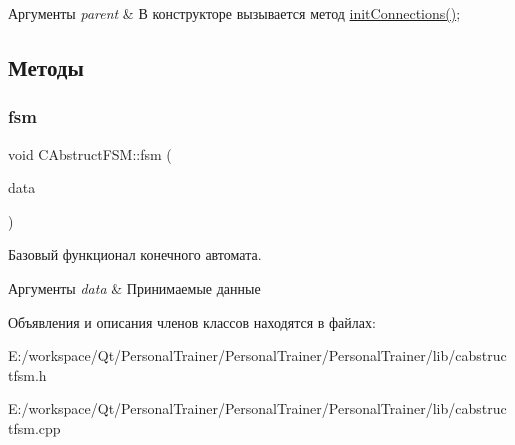 \begin{DoxyParams}{Аргументы}
{\em parent} & В конструкторе вызывается метод \hyperlink{class_c_abstruct_f_s_m_a9d6f4659a08f3028f8c047243f8dcfc3}{init\+Connections()}; \\
\hline
\end{DoxyParams}


\subsection{Методы}
\hypertarget{class_c_abstruct_f_s_m_ae06497e1f93385cd6c20eaa84fc253c1}{}\label{class_c_abstruct_f_s_m_ae06497e1f93385cd6c20eaa84fc253c1} 
\subsubsection{\texorpdfstring{fsm}{fsm}}
{\footnotesize\ttfamily void C\+Abstruct\+F\+S\+M\+::fsm (\begin{DoxyParamCaption}\item[{Q\+String $\ast$}]{data }\end{DoxyParamCaption})\hspace{0.3cm}{\ttfamily [slot]}}



Базовый функционал конечного автомата. 


\begin{DoxyParams}{Аргументы}
{\em data} & Принимаемые данные \\
\hline
\end{DoxyParams}


Объявления и описания членов классов находятся в файлах\+:\begin{DoxyCompactItemize}
\item 
E\+:/workspace/\+Qt/\+Personal\+Trainer/\+Personal\+Trainer/\+Personal\+Trainer/lib/cabstructfsm.\+h\item 
E\+:/workspace/\+Qt/\+Personal\+Trainer/\+Personal\+Trainer/\+Personal\+Trainer/lib/cabstructfsm.\+cpp\end{DoxyCompactItemize}
